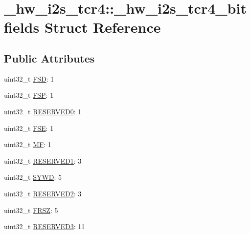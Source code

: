 \hypertarget{struct__hw__i2s__tcr4_1_1__hw__i2s__tcr4__bitfields}{}\section{\+\_\+hw\+\_\+i2s\+\_\+tcr4\+:\+:\+\_\+hw\+\_\+i2s\+\_\+tcr4\+\_\+bitfields Struct Reference}
\label{struct__hw__i2s__tcr4_1_1__hw__i2s__tcr4__bitfields}
\subsection*{Public Attributes}
\begin{DoxyCompactItemize}
\item 
uint32\+\_\+t \hyperlink{struct__hw__i2s__tcr4_1_1__hw__i2s__tcr4__bitfields_a0afa6436282eedba8bed16e05f70dca2}{F\+SD}\+: 1
\item 
uint32\+\_\+t \hyperlink{struct__hw__i2s__tcr4_1_1__hw__i2s__tcr4__bitfields_a12e9578b3102b3a480847f9416160238}{F\+SP}\+: 1
\item 
uint32\+\_\+t \hyperlink{struct__hw__i2s__tcr4_1_1__hw__i2s__tcr4__bitfields_aa2aa46cb545baad6006ccf322936b833}{R\+E\+S\+E\+R\+V\+E\+D0}\+: 1
\item 
uint32\+\_\+t \hyperlink{struct__hw__i2s__tcr4_1_1__hw__i2s__tcr4__bitfields_a1355780d71d0ab2f63d13917bcd9a74a}{F\+SE}\+: 1
\item 
uint32\+\_\+t \hyperlink{struct__hw__i2s__tcr4_1_1__hw__i2s__tcr4__bitfields_ad579390feab14d97abef8d9d2984b4f2}{MF}\+: 1
\item 
uint32\+\_\+t \hyperlink{struct__hw__i2s__tcr4_1_1__hw__i2s__tcr4__bitfields_a06bde0aaa4e96b474af7a390b8b0ef75}{R\+E\+S\+E\+R\+V\+E\+D1}\+: 3
\item 
uint32\+\_\+t \hyperlink{struct__hw__i2s__tcr4_1_1__hw__i2s__tcr4__bitfields_aa84a6c13f920418f14a26c7ab0e2e91c}{S\+Y\+WD}\+: 5
\item 
uint32\+\_\+t \hyperlink{struct__hw__i2s__tcr4_1_1__hw__i2s__tcr4__bitfields_ad07d1d1ac036810e3a1f781cb314fe90}{R\+E\+S\+E\+R\+V\+E\+D2}\+: 3
\item 
uint32\+\_\+t \hyperlink{struct__hw__i2s__tcr4_1_1__hw__i2s__tcr4__bitfields_adbba8440328fbd550bdacccc5068b1d3}{F\+R\+SZ}\+: 5
\item 
uint32\+\_\+t \hyperlink{struct__hw__i2s__tcr4_1_1__hw__i2s__tcr4__bitfields_a40ea71a1371485728a90792e23139681}{R\+E\+S\+E\+R\+V\+E\+D3}\+: 11
\end{DoxyCompactItemize}


